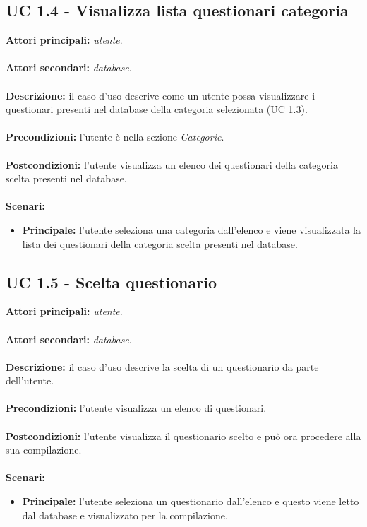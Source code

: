 \documentclass[a4paper,11pt]{article}
\begin{document}
\subsection{UC 1.4 - Visualizza lista questionari categoria}

\textbf{Attori principali:} \textit{utente}.\\
\\
\textbf{Attori secondari:} \textit{database}.\\
\\
\textbf{Descrizione:} il caso d'uso descrive come un utente possa visualizzare i questionari presenti nel database della categoria selezionata (UC 1.3). \\
\\
\textbf{Precondizioni:} l'utente è nella sezione \textit{Categorie}. \\
\\
\textbf{Postcondizioni:} l'utente visualizza un elenco dei questionari della categoria scelta presenti nel database. \\
\\
\textbf{Scenari:}
\begin{itemize}
\item \textbf{Principale:} l'utente seleziona una categoria dall'elenco e viene visualizzata la lista dei questionari della categoria scelta presenti nel database.

\end{itemize}

\subsection{UC 1.5 - Scelta questionario}

\textbf{Attori principali:} \textit{utente}.\\
\\
\textbf{Attori secondari:} \textit{database}.\\
\\
\textbf{Descrizione:} il caso d'uso descrive la scelta di un questionario da parte dell'utente. \\
\\
\textbf{Precondizioni:} l'utente visualizza un elenco di questionari. \\
\\
\textbf{Postcondizioni:} l'utente visualizza il questionario scelto e può ora procedere alla sua compilazione. \\
\\
\textbf{Scenari:}
\begin{itemize}
\item \textbf{Principale:} l'utente seleziona un questionario dall'elenco e questo viene letto dal database e visualizzato per la compilazione.

\end{itemize}
\end{document}
